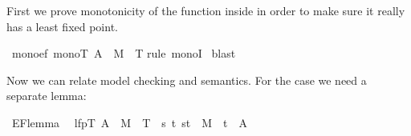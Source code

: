 \begin{isabellebody}
\begin{isamarkuptext}
First we prove monotonicity of the function inside 
in order to make sure it really has a least fixed point.%
\end{isamarkuptext}%
\isamarkuptrue%
\isamarkupfalse%
\ mono{}ef{}\ {}mono{}{}T{}\ A\ {}\ {}M{}\ {}{}\ T{}{}{}\isanewline
%
\isadelimproof
%
\endisadelimproof
%
\isatagproof
{}\isamarkupfalse%
{}rule\ monoI{}\isanewline
{}\isamarkupfalse%
\ blast\isanewline
{}\isamarkupfalse%
%
\endisatagproof
{\isafoldproof}%
%
\isadelimproof
%
\endisadelimproof
%
\begin{isamarkuptext}%
\noindent
Now we can relate model checking and semantics. For the  case we need
a separate lemma:%
\end{isamarkuptext}%
\isamarkuptrue%
\isamarkupfalse%
\ EF{}lemma{}\isanewline
\ \ {}lfp{}{}T{}\ A\ {}\ {}M{}\ {}{}\ T{}{}\ {}\ {}s{}\ {}t{}\ {}s{}t{}\ {}\ M\ {}\ t\ {}\ A{}{}%
\isadelimproof
%
\endisadelimproof

\end{isabellebody}
